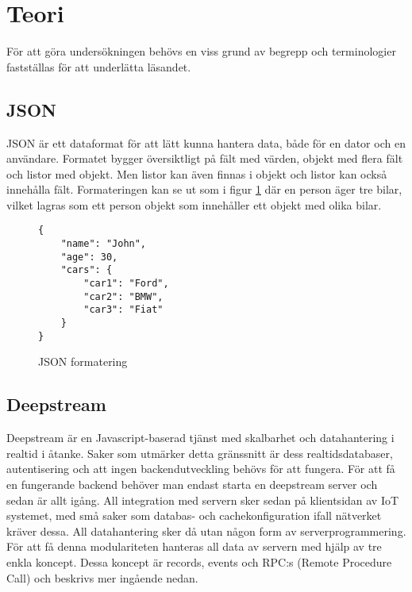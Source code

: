 \section{Teori}

\label{sec:tim-theory}
För att göra undersökningen behövs en viss grund av begrepp och terminologier fastställas för att underlätta läsandet.

\subsection{JSON}
JSON\cite{json} är ett dataformat för att lätt kunna hantera data, både för en dator och en användare. Formatet bygger översiktligt på fält med värden, objekt med flera fält och listor med objekt. Men listor kan även finnas i objekt och listor kan också innehålla fält. Formateringen kan se ut som i figur \ref{fig:tim-jsonformat} där en person äger tre bilar, vilket lagras som ett person objekt som innehåller ett objekt med olika bilar.

\lstset{language=Java}
\begin{figure}[h]
  \center
  \begin{minipage}[c]{5cm}
    \begin{lstlisting}
{
    "name": "John",
    "age": 30,
    "cars": {
        "car1": "Ford",
        "car2": "BMW",
        "car3": "Fiat"
    }
} 
    \end{lstlisting}
  \caption{JSON formatering}
  \label{fig:tim-jsonformat}
  \end{minipage}
\end{figure}

\subsection{Deepstream}
\label{subsec:tim-deepstream}
Deepstream är en Javascript-baserad tjänst med skalbarhet och datahantering i realtid i åtanke. Saker som utmärker detta gränssnitt är dess realtidsdatabaser, autentisering och att ingen backendutveckling behövs för att fungera. För att få en fungerande backend behöver man endast starta en deepstream server och sedan är allt igång. All integration med servern sker sedan på klientsidan av IoT systemet, med små saker som databas- och cachekonfiguration ifall nätverket kräver dessa. All datahantering sker då utan någon form av serverprogrammering. För att få denna modulariteten hanteras all data av servern med hjälp av tre enkla koncept. Dessa koncept är records, events och RPC:s (Remote Procedure Call) och beskrivs mer ingående nedan. 

